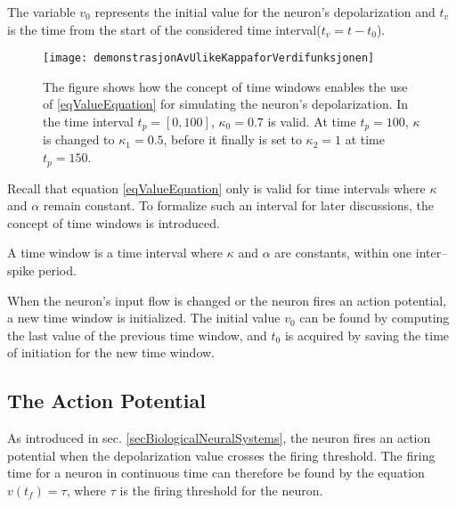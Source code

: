 		The variable $v_0$ represents the initial value for the neuron's depolarization and $t_v$ is the time from the start of the considered time interval\mbox{($t_v = t - t_0$)}.
\begin{figure}[htb!p]
    \centering
    \texttt{[image: demonstrasjonAvUlikeKappaforVerdifunksjonen]}
 	  \caption[Illustration of how time windows can be utilized to simulated the neuron by the algebraic equation]{
			The figure shows how the concept of time windows enables the use of \eqref{eqValueEquation} for simulating the neuron's depolarization.
			In the time interval $t_p = [0, 100]$, $\kappa_0 = 0.7$ is valid.
			At time $t_p = 100$, $\kappa$ is changed to $\kappa_1 = 0.5$, before it finally is set to $\kappa_2 = 1$ at time $t_p = 150$.
			}
\end{figure}
		Recall that equation \ref{eqValueEquation} only is valid for time intervals where $\kappa$ and $\alpha$ remain constant.
		To formalize such an interval for later discussions, the concept of time windows is introduced. %
		\begin{mydef}
			A time window is a time interval where $\kappa$ and $\alpha$ are constants, within one inter--spike period.
			\label{defTimeWindow}
		\end{mydef}

		When the neuron's input flow is changed or the neuron fires an action potential, a new time window is initialized.
		The initial value $v_0$ can be found by computing the last value of the previous time window, and $t_0$ is acquired by saving the time of initiation for the new time window.



	\subsection{The Action Potential}
	\label{ssecTheActionPotential}
	As introduced in sec. \ref{secBiologicalNeuralSystems}, the neuron fires an action potential when the depolarization value crosses the firing threshold.
	The firing time for a neuron in continuous time can therefore be found by the equation $v(t_f) = \tau$, where $\tau$ is the firing threshold for the neuron.

